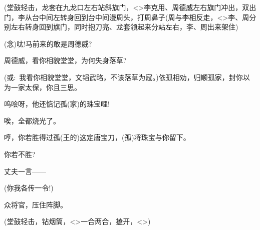 {



\vspace{5pt}

({\hwfs 堂鼓轻击}，龙套{\hwfs 在九龙口左右站斜旗门}，\textless{}\!\textgreater{}李克用、周德威{\hwfs 左右旗门冲出}，{\hwfs 双出门}，李{\hwfs 从台中间左转身回到台中间漫}周{\hwfs 头}，{\hwfs 打}周{\hwfs 鼻子}(周{\hwfs 与}李{\hwfs 相反走}，\textless{}\!\textgreater{}李、周{\hwfs 分别左右转身回到旗门}，{\hwfs 同时抱刀亮}、龙套{\hwfs 领起来分站左右}，李、周{\hwfs 出来架住})

({\akai 念})呔!马前来的敢是周德威?

周德威，看你相貌堂堂，为何失身落草?

({\akai 或}:~我看你相貌堂堂，文韬武略，不该落草为寇。)依孤相劝，归顺孤家，封你以为一家太保，你且三思。

呜哙呀，他还惦记孤(家)的珠宝哩!

唉，全都烧光了。

哼，你若胜得过孤(王的)这定唐宝刀，(孤)将珠宝与你留下。

你若不胜?\hspace{10pt}~

丈夫一言------

(你我各传一令!)

众将官，压住阵脚。


({\hwfs 堂鼓轻击}，{\hwfs 钻烟筒}，\textless{}\!\textgreater{}{\hwfs 一合两合}，{\hwfs 搕开}，\textless{}\!\textgreater{})


}
